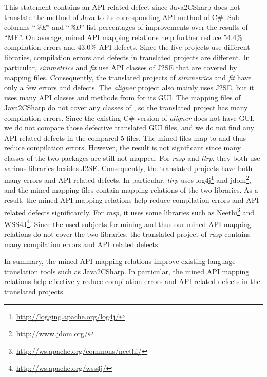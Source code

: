 This statement contains an API related defect since Java2CSharp does not translate the  method of Java to its corresponding API method of C\#. Sub-columns ``\emph{\%E}'' and ``\emph{\%D}'' list
percentages of improvements over the results of ``MF''. On average,
mined API mapping relations help further reduce 54.4\% compilation errors
and 43.0\% API defects. Since the five projects use different libraries,
compilation errors and defects in translated projects are different. In particular,
\emph{simmetrics} and \emph{fit} use API classes of J2SE that are
covered by mapping files. Consequently, the translated projects of
\emph{simmetrics} and \emph{fit} have only a few errors and defects. The
\emph{aligner} project also mainly uses J2SE, but it uses many API
classes and methods from  for its GUI. The mapping
files of Java2CSharp do not cover any classes of ,
so the translated project has many compilation errors. Since the existing C\#
version of \emph{aligner} does not have GUI, we do not compare those
defective translated GUI files, and we do not find any API related defects in the compared 5 files. The mined
files map  to  and
thus reduce compilation errors. However, the result is not
significant since many classes of the two packages are still not
mapped. For \emph{rasp} and \emph{llrp}, they both use various
libraries besides J2SE. Consequently, the translated projects have
both many errors and API related defects. In particular, \emph{llrp} uses
log4j\footnote{\url{http://logging.apache.org/log4j/}} and
jdom\footnote{\url{http://www.jdom.org/}}, and the mined mapping
files contain mapping relations of the two libraries. As a result,
the mined API mapping relations help reduce compilation errors and
API related defects significantly. For \emph{rasp}, it uses some libraries such as
Neethi\footnote{\url{http://ws.apache.org/commons/neethi/}} and
WSS4J\footnote{\url{http://ws.apache.org/wss4j/}}. Since the used
subjects for mining and thus our mined API mapping relations do not cover the
two libraries, the translated project of \emph{rasp} contains many
compilation errors and API related defects.

In summary, the mined API mapping relations improve existing language
translation tools such as Java2CSharp. In particular, the mined API
mapping relations help effectively reduce compilation errors and
API related defects in the translated projects.

